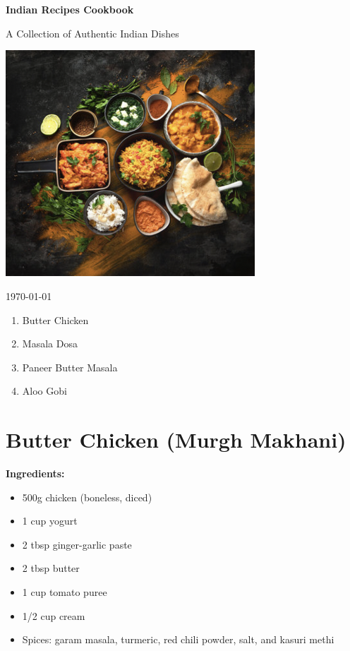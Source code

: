 \documentclass[12pt]{article}
\begin{document}
\begin{titlepage}
    \centering
    \vspace*{2cm}
    {\Huge\bfseries Indian Recipes Cookbook\par}
    \vspace{1.5cm}
    {\Large A Collection of Authentic Indian Dishes\par}
    \vfill
    \includegraphics[width=0.7\textwidth]{all_food.png} 
    \vfill
    {\large \today\par}
\end{titlepage}

\tableofcontents
\begin{enumerate}
    \item Butter Chicken
    \item Masala Dosa
    \item Paneer Butter Masala
    \item Aloo Gobi
\end{enumerate}
\newpage

\section*{Butter Chicken (Murgh Makhani)}
\textbf{Ingredients:}
\begin{itemize}
    \item 500g chicken (boneless, diced)
    \item 1 cup yogurt
    \item 2 tbsp ginger-garlic paste
    \item 2 tbsp butter
    \item 1 cup tomato puree
    \item 1/2 cup cream
    \item Spices: garam masala, turmeric, red chili powder, salt, and kasuri methi
\end{itemize}
\end{document}
